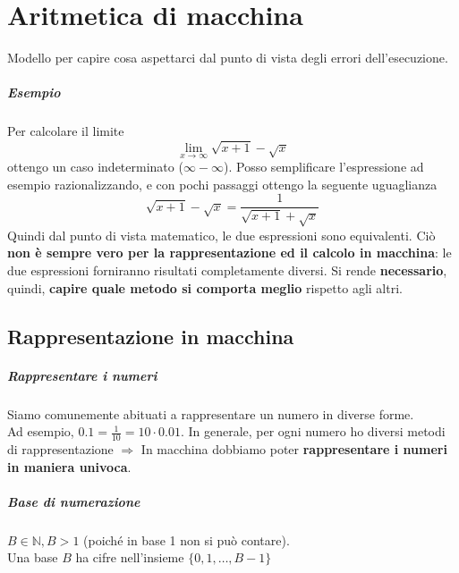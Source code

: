 \documentclass[10pt]{book}
\begin{document}
\chapter{Aritmetica di macchina}
Modello per capire cosa aspettarci dal punto di vista degli errori dell'esecuzione.
\paragraph{Esempio} Per calcolare il limite $$\lim_{x\to\infty} \sqrt{x + 1} - \sqrt{x}$$ ottengo un caso indeterminato ($\infty - \infty$). Posso semplificare l'espressione ad esempio razionalizzando, e con pochi passaggi ottengo la seguente uguaglianza $$\sqrt{x + 1} - \sqrt{x} = \frac{1}{\sqrt{x + 1} + \sqrt{x}}$$ Quindi dal punto di vista matematico, le due espressioni sono equivalenti. Ciò \textbf{non è sempre vero per la rappresentazione ed il calcolo in macchina}: le due espressioni forniranno risultati completamente diversi. Si rende \textbf{necessario}, quindi, \textbf{capire quale metodo si comporta meglio} rispetto agli altri.
\section{Rappresentazione in macchina}
\paragraph{Rappresentare i numeri} Siamo comunemente abituati a rappresentare un numero in diverse forme.\\
Ad esempio, $0.1 = \frac{1}{10} = 10 \cdot 0.01$. In generale, per ogni numero ho diversi metodi di rappresentazione $\Rightarrow$ In macchina dobbiamo poter \textbf{rappresentare i numeri in maniera univoca}.
\paragraph{Base di numerazione} $B \in \mathbb{N}, B > 1$ (poiché in base 1 non si può contare).\\Una base $B$ ha cifre nell'insieme $\{0, 1, \ldots, B - 1\}$
\end{document}
